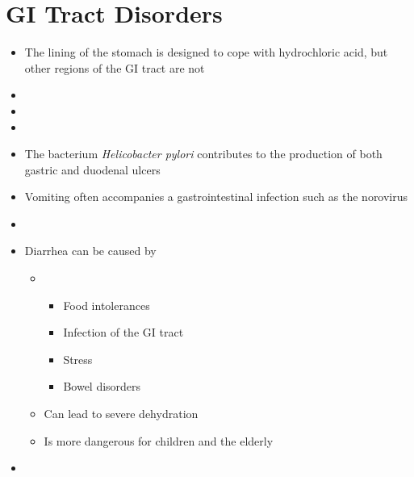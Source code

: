 \documentclass[title={Chapter 3}]{fdsn201notes}
\begin{document}
\section{GI Tract Disorders}\label{sec:gi-tract-disorders}
\begin{itemize}
	\item The lining of the stomach is designed to cope with hydrochloric acid, but other regions of the GI tract are not
	\item {}
	\item {}
	\item {}
	\item The bacterium \emph{Helicobacter pylori} contributes to the production of both gastric and duodenal ulcers
	\item Vomiting often accompanies a gastrointestinal infection such as the norovirus
	\item {}
	\item Diarrhea can be caused by
	\begin{itemize}
		\item[~]
		\begin{itemize}
			\item Food intolerances
			\item Infection of the GI tract
			\item Stress
			\item Bowel disorders
		\end{itemize}
		\item Can lead to severe dehydration
		\item Is more dangerous for children and the elderly
	\end{itemize}
	\item {}
\end{itemize}
\end{document}
